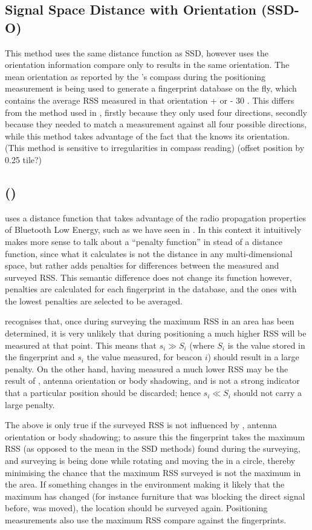 \subsection{Signal Space Distance with Orientation (SSD-O)}
This method uses the same distance function as SSD, however uses the orientation information compare only to results in the same orientation.
The mean orientation as reported by the \device's compass during the positioning measurement is being used to generate a fingerprint database on the fly, which contains the average RSS measured in that orientation + or - 30 \textdegree{}.
This differs from the method used in \citet{bahl2000radar}, firstly because they only used four directions, secondly because they needed to match a measurement against all four possible directions, while this method takes advantage of the fact that the \device knows its orientation.
(This method is sensitive to irregularities in compass reading)
(offset position by 0.25 tile?)

\subsection{\BRP (\aBRP)}
\BRP uses a distance function that takes advantage of the radio propagation properties of Bluetooth Low Energy, such as we have seen in .
In this context it intuitively makes more sense to talk about a ``penalty function'' in stead of a distance function, since what it calculates is not the distance in any multi-dimensional space, but rather adds penalties for differences between the measured and surveyed RSS.
This semantic difference does not change its function however, penalties are calculated for each fingerprint in the database, and the ones with the lowest penalties are selected to be averaged.

\BRP recognises that, once during surveying the maximum RSS in an area has been determined, it is very unlikely that during positioning a much higher RSS will be measured at that point.
This means that $s_i \gg S_i$ (where $S_i$ is the value stored in the fingerprint and $s_i$ the value measured, for beacon $i$) should result in a large penalty.
On the other hand, having measured a much lower RSS may be the result of \mpi, antenna orientation or body shadowing, and is not a strong indicator that a particular position should be discarded; hence $s_i \ll S_i$ should not carry a large penalty.

The above is only true if the surveyed RSS is not influenced by \mpi, antenna orientation or body shadowing; to assure this the fingerprint takes the maximum RSS (as opposed to the mean in the SSD methods) found during the surveying, and surveying is being done while rotating and moving the \device in a circle, thereby minimising the chance that the maximum RSS surveyed is not the maximum in the area.
If something changes in the environment making it likely that the maximum has changed (for instance furniture that was blocking the direct signal before, was moved), the location should be surveyed again.
Positioning measurements also use the maximum RSS compare against the fingerprints.

